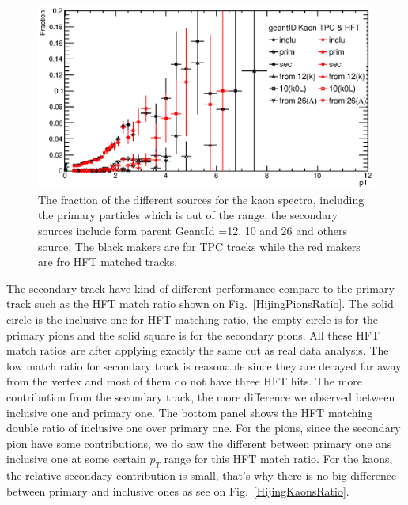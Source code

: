 \begin{figure}[htbp]
\centering
\includegraphics[keepaspectratio,width=1.0\textwidth,angle=0]{figure/Run14_D0HFT/Fraction_Kaon.eps}
\caption{The fraction of the different sources for the kaon spectra, including the primary particles which is out of the range, the secondary sources include form parent GeantId =12, 10 and 26 and others source. The black makers are for TPC tracks while the red makers are fro HFT matched tracks.}
\label{Fraction_Kaon}
\end{figure}


The secondary track have kind of different performance compare to the primary track such as the HFT match ratio shown on Fig.~\ref{HijingPionsRatio}. The solid circle is the inclusive one for HFT matching ratio, the empty circle is for the primary pions and the solid square is for the secondary pions. All these HFT match ratios are after applying exactly the same cut as real data analysis. The low match ratio for secondary track is reasonable since they are decayed far away from the vertex and most of them do not have three HFT hits. The more contribution from the secondary track, the more difference we observed between inclusive one and primary one. The bottom panel shows the HFT matching double ratio of inclusive one over primary one. For the pions, since the secondary pion have some contributions, we do saw the different between primary one ans inclusive one at some certain $p_T$ range for this HFT match ratio. For the kaons, the relative secondary contribution is small, that's why there is no big difference between primary and inclusive ones as see on Fig.~\ref{HijingKaonsRatio}. 

